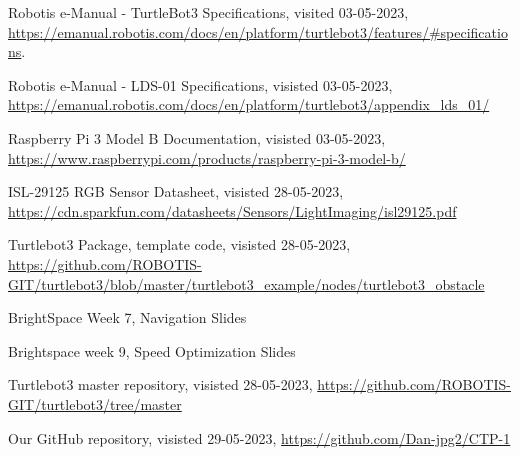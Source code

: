 \documentclass[conference]{IEEEtran}
\begin{document}
\begin{thebibliography}{00}
 \raggedright Robotis e-Manual - TurtleBot3 Specifications, visited 03-05-2023, \url{https://emanual.robotis.com/docs/en/platform/turtlebot3/features/#specifications}.
 \raggedright Robotis e-Manual - LDS-01 Specifications, visisted 03-05-2023, \url{https://emanual.robotis.com/docs/en/platform/turtlebot3/appendix_lds_01/}
 \raggedright Raspberry Pi 3 Model B Documentation, visisted 03-05-2023, \url{https://www.raspberrypi.com/products/raspberry-pi-3-model-b/}
 \raggedright ISL-29125 RGB Sensor Datasheet, visisted 28-05-2023, \url{https://cdn.sparkfun.com/datasheets/Sensors/LightImaging/isl29125.pdf}
 \raggedright Turtlebot3 Package, template code, visisted 28-05-2023, \url{https://github.com/ROBOTIS-GIT/turtlebot3/blob/master/turtlebot3_example/nodes/turtlebot3_obstacle}
 \raggedright BrightSpace Week 7, Navigation Slides
 \raggedright Brightspace week 9, Speed Optimization Slides
 \raggedright Turtlebot3 master repository, visisted 28-05-2023, \url{https://github.com/ROBOTIS-GIT/turtlebot3/tree/master}
 \raggedright Our GitHub repository, visisted 29-05-2023, \url{https://github.com/Dan-jpg2/CTP-1}

\end{thebibliography}
\end{document}
